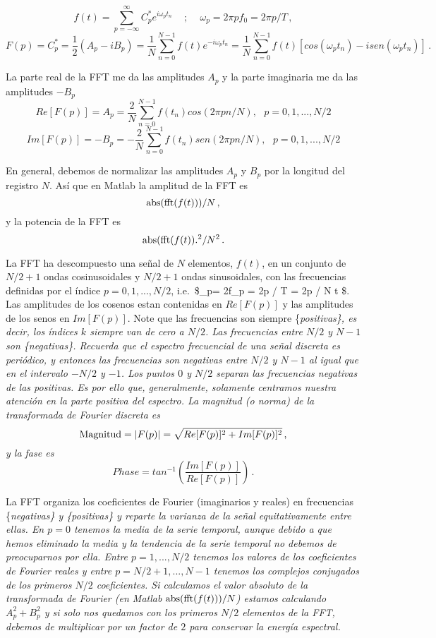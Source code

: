 \documentclass[
]{agujournal2019}
\begin{document}
\[f(t)=\sum\limits^\infty_{p=-\infty} C^*_p e^{i\omega_p t_n}\,\,\,\,\,\,\,;\,\,\,\,\,\,\,\omega_p=2 \pi p f_0=2\pi p/T\,,\]
\[F(p)=C^*_p=\frac{1}{2}(A_p-iB_p)=\frac{1}{N} \sum\limits^{N-1}_{n=0} f(t) e^{-i \omega_p t_n} =
        \frac{1}{N} \sum\limits^{N-1}_{n=0}f(t) [cos(\omega_p t_n) - isen(\omega_p t_n) ]\,.\]

La parte real de la FFT me da las amplitudes \(A_p\) y la parte
imaginaria me da las amplitudes \(-B_p\)
\[Re [F(p)]=A_p=\frac{2}{N}\sum\limits_{n=0}^{N-1} f(t_n) cos(2\pi p n /N),\,\,\,\,p=0,1,...,N/2\]
\[Im [F(p)]=-B_p=-\frac{2}{N}\sum\limits_{n=0}^{N-1} f(t_n) sen(2\pi p n /N),\,\,\,\,p=0,1,...,N/2\]

En general, debemos de normalizar las amplitudes \(A_p\) y \(B_p\) por
la longitud del registro \(N\). Así que en Matlab la amplitud de la FFT
es \[{\rm abs}({\rm fft}(f(t)))/N\,,\] y la potencia de la FFT es
\[{\rm abs}({\rm fft}(f(t)).^2/N^2\,.\]

La FFT ha descompuesto una señal de \(N\) elementos, \(f(t)\), en un
conjunto de \(N/2 +1\) ondas cosinusoidales y \(N/2 + 1\) ondas
sinusoidales, con las frecuencias definidas por el índice
\(p=0,1,...,N/2\), i.e.~\$\omega\_p= 2\pi f\_p = 2\pi p / T = 2\pi p / N
\Delta t \$. Las amplitudes de los cosenos estan contenidas en
\(Re [F(p)]\) y las amplitudes de los senos en \(Im [F(p)]\). Note que
las frecuencias son siempre \{\it positivas\}, es decir, los índices
\(k\) siempre van de cero a \(N/2\). Las frecuencias entre \(N/2\) y
\(N-1\) son \{\it negativas\}. Recuerda que el espectro frecuencial de
una señal discreta es periódico, y entonces las frecuencias son
negativas entre \(N/2\) y \(N-1\) al igual que en el intervalo \(-N/2\)
y \(-1\). Los puntos \(0\) y \(N/2\) separan las frecuencias negativas
de las positivas. Es por ello que, generalmente, solamente centramos
nuestra atención en la parte positiva del espectro. La magnitud (o
norma) de la transformada de Fourier discreta es
\[{\rm Magnitud}=|F(p)|=\sqrt{Re [F(p)]^2 + Im[F(p)]^2}\,,\] y la fase
es \[Phase=tan^{-1}\left( \frac{Im[F(p)]}{Re [F(p)]} \right)\,.\]

La FFT organiza los coeficientes de Fourier (imaginarios y reales) en
frecuencias \{\it negativas\} y \{\it positivas\} y reparte la varianza
de la señal equitativamente entre ellas. En \(p=0\) tenemos la media de
la serie temporal, aunque debido a que hemos eliminado la media y la
tendencia de la serie temporal no debemos de preocuparnos por ella.
Entre \(p=1,...,N/2\) tenemos los valores de los coeficientes de Fourier
reales y entre \(p=N/2+1,...,N-1\) tenemos los complejos conjugados de
los primeros \(N/2\) coeficientes. Si calculamos el valor absoluto de la
transformada de Fourier (en Matlab \({\rm abs}({\rm fft}(f(t)))/N\))
estamos calculando \(A_p^2 + B_p^2\) y si solo nos quedamos con los
primeros \(N/2\) elementos de la FFT, debemos de multiplicar por un
factor de \(2\) para conservar la energía espectral.
\end{document}

